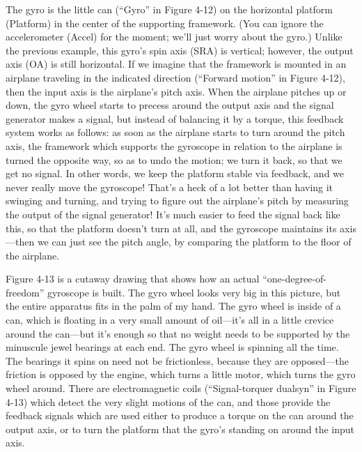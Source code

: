 \documentclass[11pt,oneside]{article}
\begin{document}
The gyro is the little can (``Gyro'' in Figure 4-12) on the horizontal platform (Platform) in the center of the supporting framework. (You can ignore the accelerometer (Accel) for the moment; we'll just worry about the gyro.) Unlike the previous example, this gyro's spin axis (SRA) is vertical; however, the output axis (OA) is still horizontal. If we imagine that the framework is mounted in an airplane traveling in the indicated direction (``Forward motion'' in Figure 4-12), then the input axis is the airplane's pitch axis. When the airplane pitches up or down, the gyro wheel starts to precess around the output axis and the signal generator makes a signal, but instead of balancing it by a torque, this feedback system works as follows: as soon as the airplane starts to turn around the pitch axis, the framework which supports the gyroscope in relation to the airplane is turned the opposite way, so as to undo the motion; we turn it back, so that we get no signal. In other words, we keep the platform stable via feedback, and we never really move the gyroscope! That's a heck of a lot better than having it swinging and turning, and trying to figure out the airplane's pitch by measuring the output of the signal generator! It's much easier to feed the signal back like this, so that the platform doesn't turn at all, and the gyroscope maintains its axis---then we can just see the pitch angle, by comparing the platform to the floor of the airplane.\par

Figure 4-13 is a cutaway drawing that shows how an actual ``one-degree-of-freedom'' gyroscope is built. The gyro wheel looks very big in this picture, but the entire apparatus fits in the palm of my hand. The gyro wheel is inside of a can, which is floating in a very small amount of oil---it's all in a little crevice around the can---but it's enough so that no weight needs to be supported by the minuscule jewel bearings at each end. The gyro wheel is spinning all the time. The bearings it spins on need not be frictionless, because they are opposed---the friction is opposed by the engine, which turns a little motor, which turns the gyro wheel around. There are electromagnetic coils (``Signal-torquer dualsyn'' in Figure 4-13) which detect the very slight motions of the can, and those provide the feedback signals which are used either to produce a torque on the can around the output axis, or to turn the platform that the gyro's standing on around the input axis.\par
\end{document}
